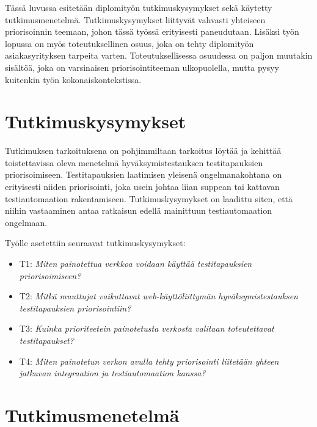 Tässä luvussa esitetään diplomityön tutkimuskysymykset sekä käytetty tutkimusmenetelmä.
Tutkimuskysymykset liittyvät vahvasti yhteiseen priorisoinnin teemaan, johon tässä työssä erityisesti paneudutaan.
Lisäksi työn lopussa on myös toteutuksellinen osuus, joka on tehty diplomityön asiakasyrityksen tarpeita varten.
Toteutuksellisessa osuudessa on paljon muutakin sisältöä, joka on varsinaisen priorisointiteeman ulkopuolella, mutta pysyy kuitenkin työn kokonaiskontekstissa.

\section{Tutkimuskysymykset}

Tutkimuksen tarkoituksena on pohjimmiltaan tarkoitus löytää ja kehittää toistettavissa oleva menetelmä hyväksymistestauksen testitapauksien priorisoimiseen.
Testitapauksien laatimisen yleisenä ongelmanakohtana on erityisesti niiden priorisointi, joka usein johtaa liian suppean tai kattavan testiautomaation rakentamiseen.
Tutkimuskysymykset on laadittu siten, että niihin vastaaminen antaa ratkaisun edellä mainittuun testiautomaation ongelmaan.

Työlle asetettiin seuraavat tutkimuskysymykset:
\begin{itemize}
  \item T1: \emph{Miten painotettua verkkoa voidaan käyttää testitapauksien priorisoimiseen?}
  \item T2: \emph{Mitkä muuttujat vaikuttavat web-käyttöliittymän hyväksymistestauksen testitapauksien priorisointiin?}
  \item T3: \emph{Kuinka prioriteetein painotetusta verkosta valitaan toteutettavat testitapaukset?}
  \item T4: \emph{Miten painotetun verkon avulla tehty priorisointi liitetään yhteen jatkuvan integraation ja testiautomaation kanssa?}
\end{itemize}

\section{Tutkimusmenetelmä}

